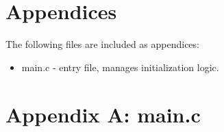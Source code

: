 \documentclass[letterpaper,11pt]{texMemo} %
\begin{document}
\section*{Appendices}
The following files are included as appendices:
\begin{itemize}
\item main.c - entry file, manages initialization logic.
\end{itemize}
\newpage

\section*{Appendix A: main.c}
\begin{tiny}

\end{tiny}
\newpage
\end{document}
